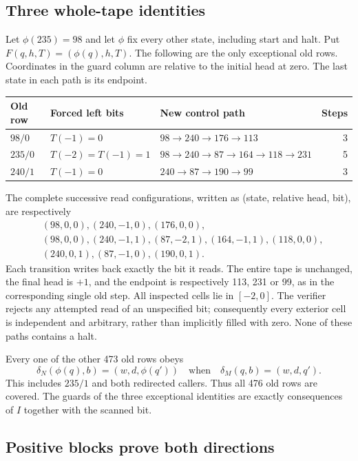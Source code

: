 \documentclass[11pt]{article}
\begin{document}
\subsection{Three whole-tape identities}

Let $\phi(235)=98$ and let $\phi$ fix every other state, including
start and halt.  Put $F(q,h,T)=(\phi(q),h,T)$.  The following are the
only exceptional old rows.  Coordinates in the guard column are relative
to the initial head at zero.  The last state in each path is its endpoint.

\begin{center}\small
\begin{tabularx}{\textwidth}{@{}l l X r@{}}
\toprule
Old row & Forced left bits & New control path & Steps\\\midrule
$98/0$ & $T(-1)=0$ & $98\to240\to176\to113$ & 3\\
$235/0$ & $T(-2)=T(-1)=1$ & $98\to240\to87\to164\to118\to231$ & 5\\
$240/1$ & $T(-1)=0$ & $240\to87\to190\to99$ & 3\\
\bottomrule
\end{tabularx}
\end{center}

The complete successive read configurations, written as
(state, relative head, bit), are respectively
\begin{align*}
 &(98,0,0),(240,-1,0),(176,0,0),\\
 &(98,0,0),(240,-1,1),(87,-2,1),(164,-1,1),(118,0,0),\\
 &(240,0,1),(87,-1,0),(190,0,1).
\end{align*}
Each transition writes back exactly the bit it reads.  The entire tape
is unchanged, the final head is $+1$, and the endpoint is respectively
113, 231 or 99, as in the corresponding single old step.  All inspected
cells lie in $[-2,0]$.  The verifier rejects any attempted read of an
unspecified bit; consequently every exterior cell is independent and
arbitrary, rather than implicitly filled with zero.  None of these paths
contains a halt.

Every one of the other 473 old rows obeys
\[
 \delta_N(\phi(q),b)=(w,d,\phi(q'))
 \quad\text{when}\quad \delta_M(q,b)=(w,d,q').
\]
This includes $235/1$ and both redirected callers.  Thus all 476 old
rows are covered.  The guards of the three exceptional identities are
exactly consequences of $I$ together with the scanned bit.

\subsection{Positive blocks prove both directions}
\end{document}

